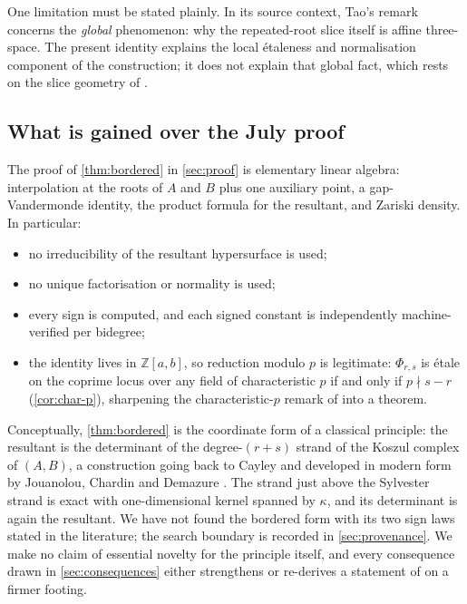 \documentclass[11pt,reqno]{amsart}
\theoremstyle{definition}
\theoremstyle{remark}
\newcommand{\Z}{\mathbb Z}
\begin{document}
One limitation must be stated plainly.  In its source context, Tao's
remark concerns the \emph{global} phenomenon: why the repeated-root
slice itself is affine three-space.  The present identity explains
the local \'etaleness and normalisation component of the
construction; it does not explain that global fact, which rests on
the slice geometry of \cite{DDAS}.

\subsection*{What is gained over the July proof}

The proof of \cref{thm:bordered} in \cref{sec:proof} is elementary
linear algebra: interpolation at the roots of $A$ and $B$ plus one
auxiliary point, a gap-Vandermonde identity, the product formula for
the resultant, and Zariski density.  In particular:

\begin{itemize}[leftmargin=2.2em]
\item no irreducibility of the resultant hypersurface is used;
\item no unique factorisation or normality is used;
\item every sign is computed, and each signed constant is
independently machine-verified per bidegree;
\item the identity lives in $\Z[a,b]$, so reduction modulo $p$ is
legitimate: $\Phi_{r,s}$ is \'etale on the coprime locus over any
field of characteristic $p$ if and only if $p\nmid s-r$
(\cref{cor:char-p}), sharpening the characteristic-$p$ remark of
\cite{DDAS} into a theorem.
\end{itemize}

Conceptually, \cref{thm:bordered} is the coordinate form of a
classical principle: the resultant is the determinant of the
degree-$(r+s)$ strand of the Koszul complex of $(A,B)$, a construction
going back to Cayley and developed in modern form by Jouanolou,
Chardin and Demazure
\cite{Cayley1848,Jouanolou1991,Chardin1992,Demazure2012,GKZ}.  The
strand just above the Sylvester strand is exact with one-dimensional
kernel spanned by $\kappa$, and its determinant is again the
resultant.  We have not found the bordered form with its two sign laws
stated in the literature; the search boundary is recorded in
\cref{sec:provenance}.  We make no claim of essential novelty for the
principle itself, and every consequence drawn in
\cref{sec:consequences} either strengthens or re-derives a statement
of \cite{DDAS} on a firmer footing.
\end{document}
